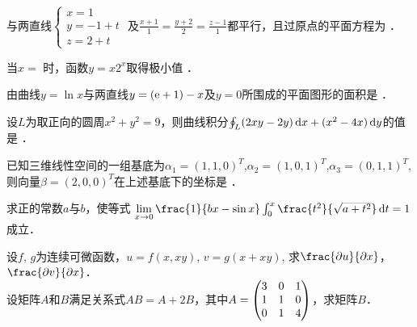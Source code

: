 \documentclass[plain,noanswer,medmath]{../../template/jnuexam}
\begin{document}




\begin{problem}
与两直线$\begin{cases}
  x = 1 \\
  y = - 1 + t \\
  z = 2 + t
\end{cases}$
及$\frac{x + 1}{1} = \frac{y + 2}{2} = \frac{z - 1}{1}$都平行，且过原点的平面方程为 \fillin{}．
\end{problem}


\begin{problem}
当$x =$      时，函数$y = x2^x$取得极小值 \fillin{}．
\end{problem}


\begin{problem}
由曲线$y = \ln x$与两直线$y = (\mathrm{e} + 1) - x$及$y = 0$所围成的平面图形的面积是 \fillin{}．
\end{problem}


\begin{problem}
设$L$为取正向的圆周$x^2 + y^2 = 9$，则曲线积分$\oint_L (2xy - 2y)\mathop{}\!\mathrm{d} x + (x^2 - 4x)\mathop{}\!\mathrm{d} y$的值是 \fillin{}．
\end{problem}


\begin{problem}
已知三维线性空间的一组基底为$\alpha_1 = (1,1,0)^T$,$\alpha_2 = (1,0,1)^T$,$\alpha_3 = (0,1,1)^T$,
则向量$\beta = (2,0,0)^T$在上述基底下的坐标是 \fillin{}．
\end{problem}



\begin{problem}
求正的常数$a$与$b$，使等式
$\smash[t]{\lim_{x \to 0}\frac{1}{bx-\sin x}\int_0^x \frac{t^2}{\sqrt{a + t^2}}\dt = 1}$成立．
\end{problem}




\begin{problem}[points=3]
设$f$, $g$为连续可微函数，$u = f(x,xy)$, $v = g(x+xy)$,
求$\frac{\pdu}{\pdx}$，$\frac{\pdv}{\pdx}$．
\end{problem}


\begin{problem}[points=4]
设矩阵$A$和$B$满足关系式$AB = A + 2B$，其中$\smash[t]{A=\begin{pmatrix}
 3&0&1 \\
 1&1&0 \\
 0&1&4
\end{pmatrix}}$，求矩阵$B$．
\end{problem}
\end{document}
